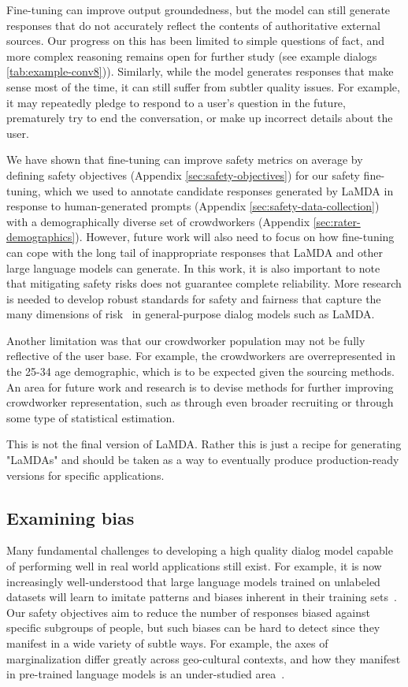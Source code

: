 \documentclass{article}
\begin{document}
Fine-tuning can improve output groundedness, but the model can still generate responses that do not accurately reflect the contents of authoritative external sources. Our progress on this has been limited to simple questions of fact, and more complex reasoning remains open for further study (see example dialogs \ref{tab:example-conv8})). Similarly, while the model generates responses that make sense most of the time, it can still suffer from subtler quality issues. For example, it may repeatedly pledge to respond to a user’s question in the future, prematurely try to end the conversation, or make up incorrect details about the user.

We have shown that fine-tuning can improve safety metrics on average by defining safety objectives (Appendix \ref{sec:safety-objectives}) for our safety fine-tuning, which we used to annotate candidate responses generated by LaMDA in response to human-generated prompts (Appendix \ref{sec:safety-data-collection}) with a demographically diverse set of crowdworkers (Appendix \ref{sec:rater-demographics}). However, future work will also need to focus on how fine-tuning can cope with the long tail of inappropriate responses that LaMDA and other large language models can generate. In this work, it is also important to note that mitigating safety risks does not guarantee complete reliability. More research is needed to develop robust standards for safety and fairness that capture the many dimensions of risk~\cite{weidinger2021ethical} in general-purpose dialog models such as LaMDA. \

Another limitation was that our crowdworker population may not be fully reflective of the user base. For example, the crowdworkers are  overrepresented in the 25-34 age demographic, which is to be expected given the sourcing methods. An area for future work and research is to devise methods for further improving crowdworker representation, such as through  even broader recruiting or through some type of statistical estimation.

This is not the final version of LaMDA. Rather this is just a recipe for generating "LaMDAs" and should be taken as a way to eventually produce production-ready versions for specific applications.

\subsection{Examining bias}
Many fundamental challenges to developing a high quality dialog model capable of performing well in real world applications still exist. For example, it is now increasingly well-understood that large language models trained on unlabeled datasets will learn to imitate patterns and biases inherent in their training sets~\cite{tan2019assessing}. Our safety objectives aim to reduce the number of responses biased against specific subgroups of people, but such biases can be hard to detect since they manifest in a wide variety of subtle ways. For example, the axes of marginalization differ greatly across geo-cultural contexts, and how they manifest in pre-trained language models is an under-studied area~\cite{sambasivan2021reimagining}.
\end{document}
